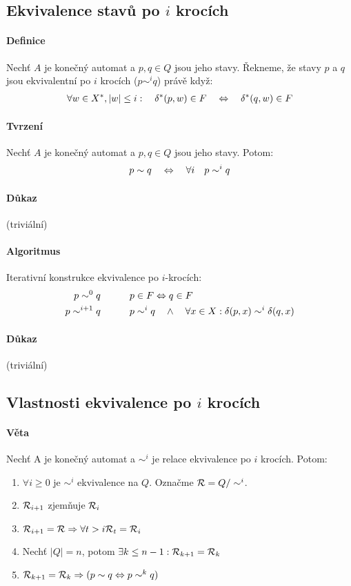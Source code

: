 \documentclass[a4paper,12pt,titlepage]{article}
\begin{document}
\subsection{Ekvivalence stavů po $i$ krocích}
\setcounter{equation}{0}
\paragraph{Definice}
Nechť $A$ je konečný automat a $p, q \in Q$ jsou jeho stavy. Řekneme, že stavy $p$
a $q$ jsou ekvivalentní po $i$ krocích ($p \sim^i q$) právě když:
\begin{align}
\forall w \in X^*, |w| \le i: \quad \delta^*(p, w) \in F \quad\Leftrightarrow\quad \delta^*(q,w) \in
F
\end{align}
\paragraph{Tvrzení}
Nechť $A$ je konečný automat a $p, q \in Q$ jsou jeho stavy. Potom:
\begin{align}
	p \sim q \quad\Leftrightarrow\quad \forall i \quad p \sim^i q
\end{align}
\paragraph{Důkaz} (triviální)
\paragraph{Algoritmus}
Iterativní konstrukce ekvivalence po $i$-krocích:
\begin{align}
	p \sim^0 q \quad\qquad &p \in F \Leftrightarrow q \in F \\
	p \sim^{i+1} q \quad\qquad &p \sim^i q \quad\land\quad \forall x \in X: \delta(p, x) \sim^i
	\delta(q,x)
\end{align}
\paragraph{Důkaz} (triviální)
\subsection{Vlastnosti ekvivalence po $i$ krocích}
\setcounter{equation}{0}
\paragraph{Věta}
Nechť A je konečný automat a $\sim^i$ je relace ekvivalence po $i$ krocích.
Potom:
\begin{enumerate}
	\item $\forall i \ge 0$ je $\sim^i$ ekvivalence na $Q$. Označme $\mathcal{R} =
	Q/\sim^i$.
	\item $\mathcal{R}_{i+1}$ zjemňuje $\mathcal{R}_i$
	\item $\mathcal{R}_{i+1} = \mathcal{R} \Rightarrow \forall t > i \mathcal{R}_t = \mathcal{R}_i$
	\item Nechť $|Q| = n$, potom $\exists k \le n-1: \mathcal{R}_{k+1} = \mathcal{R}_k$
	\item $\mathcal{R}_{k+1} = \mathcal{R}_k \Rightarrow (p \sim q \Leftrightarrow p \sim^k q)$
\end{enumerate}
\end{document}
